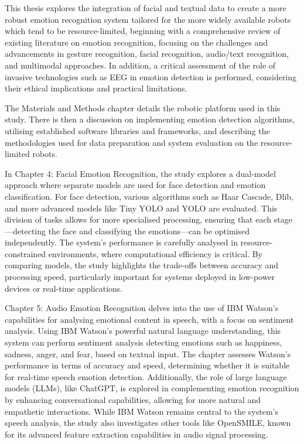 This thesis explores the integration of facial and textual data to create a more robust emotion recognition system tailored for the more widely available robots which tend to be resource-limited, beginning with a comprehensive review of existing literature on emotion recognition, focusing on the challenges and advancements in gesture recognition, facial recognition, audio/text recognition, and multimodal approaches. In addition, a critical assessment of the role of invasive technologies such as EEG in emotion detection is performed, considering their ethical implications and practical limitations.

The Materials and Methods chapter details the robotic platform used in this study. There is then a discussion on implementing emotion detection algorithms, utilising established software libraries and frameworks, and describing the methodologies used for data preparation and system evaluation on the resource-limited robots.

In Chapter 4: Facial Emotion Recognition, the study explores a dual-model approach where separate models are used for face detection and emotion classification. For face detection, various algorithms such as Haar Cascade, Dlib, and more advanced models like Tiny YOLO and YOLO are evaluated. This division of tasks allows for more specialised processing, ensuring that each stage—detecting the face and classifying the emotions—can be optimised independently. The system's performance is carefully analysed in resource-constrained environments, where computational efficiency is critical. By comparing models, the study highlights the trade-offs between accuracy and processing speed, particularly important for systems deployed in low-power devices or real-time applications. 

Chapter 5: Audio Emotion Recognition delves into the use of IBM Watson's capabilities for analysing emotional content in speech, with a focus on sentiment analysis. Using IBM Watson's powerful natural language understanding, this system can perform sentiment analysis detecting emotions such as happiness, sadness, anger, and fear, based on textual input. The chapter assesses Watson's performance in terms of accuracy and speed, determining whether it is suitable for real-time speech emotion detection. Additionally, the role of large language models (LLMs), like ChatGPT, is explored in complementing emotion recognition by enhancing conversational capabilities, allowing for more natural and empathetic interactions. While IBM Watson remains central to the system's speech analysis, the study also investigates other tools like OpenSMILE, known for its advanced feature extraction capabilities in audio signal processing.

